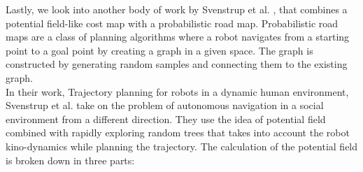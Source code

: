 Lastly, we look into another body of work by Svenstrup et al. \cite{svenstrup_trajectory_2010}, that combines a potential field-like cost map with a probabilistic road map. Probabilistic road maps \cite{kavraki_probabilistic_1996} are a class of planning algorithms where a robot navigates from a starting point to a goal point by creating a graph in a given space. The graph is constructed by generating random samples and connecting them to the existing graph.\\
In their work, Trajectory planning for robots in a dynamic human environment, Svenstrup et al. take on the problem of autonomous navigation in a social environment from a different direction. They use the idea of potential field combined with rapidly exploring random trees that takes into account the robot kino-dynamics while planning the trajectory.
The calculation of the potential field is broken down in three parts:
